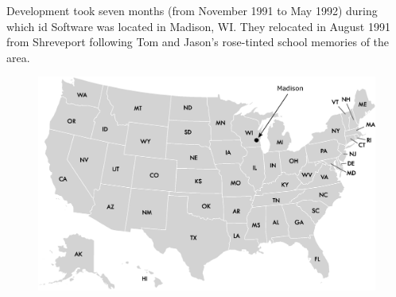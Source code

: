 \documentclass[book.tex]{subfiles}
\begin{document}
Development took seven months (from November 1991 to May 1992) during which id Software was located in Madison, WI. They relocated in August 1991 from Shreveport following Tom and Jason's rose-tinted school memories of the area.
\begin{figure}[H]
\centering
 \includegraphics[width=\textwidth]{imgs/drawings/map/usa-id-software.eps}
 \end{figure}
\end{document}
